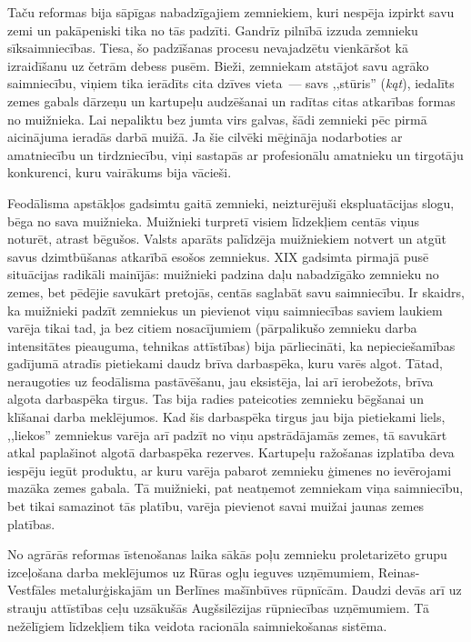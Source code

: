 \documentclass[twoside,a5paper,12pt,fleqn,openany]{extbook}
\newcommand{\pltxti}[1]{\textit{\textpolish{#1}}}
\begin{document}
Taču reformas bija sāpīgas nabadzīgajiem zemniekiem, kuri nespēja izpirkt savu zemi un pakāpeniski tika no tās padzīti. Gandrīz pilnībā izzuda zemnieku sīksaimniecības. Tiesa, šo padzīšanas procesu nevajadzētu vienkāršot kā izraidīšanu uz četrām debess pusēm. Bieži, zemniekam atstājot savu agrāko saimniecību, viņiem tika ierādīts cita dzīves vieta~--- savs ,,stūris'' (\pltxti{kąt}), iedalīts zemes gabals dārzeņu un kartupeļu audzēšanai un radītas citas atkarības formas no muižnieka. Lai nepaliktu bez jumta virs galvas, šādi zemnieki pēc pirmā aicinājuma ieradās darbā muižā. Ja šie cilvēki mēģināja nodarboties ar amatniecību un tirdzniecību, viņi sastapās ar profesionālu amatnieku un tirgotāju konkurenci, kuru vairākums bija vācieši.

Feodālisma apstākļos gadsimtu gaitā zemnieki, neizturējuši ekspluatācijas slogu, bēga no sava muižnieka. Muižnieki turpretī visiem līdzekļiem centās viņus noturēt, atrast bēgušos. Valsts aparāts palīdzēja muižniekiem notvert un atgūt savus dzimtbūšanas atkarībā esošos zemniekus. XIX gadsimta pirmajā pusē situācijas radikāli mainījās: muižnieki padzina daļu nabadzīgāko zemnieku no zemes, bet pēdējie savukārt pretojās, centās saglabāt savu saimniecību. Ir skaidrs, ka muižnieki padzīt zemniekus un pievienot viņu saimniecības saviem laukiem varēja tikai tad, ja bez citiem nosacījumiem (pārpalikušo zemnieku darba intensitātes pieauguma, tehnikas attīstības) bija pārliecināti, ka nepieciešamības gadījumā atradīs pietiekami daudz brīva darbaspēka, kuru varēs algot. Tātad, neraugoties uz feodālisma pastāvēšanu, jau eksistēja, lai arī ierobežots, brīva algota darbaspēka tirgus. Tas bija radies pateicoties zemnieku bēgšanai un klīšanai darba meklējumos. Kad šis darbaspēka tirgus jau bija pietiekami liels, ,,liekos'' zemniekus varēja arī padzīt no viņu apstrādājamās zemes, tā savukārt atkal paplašinot algotā darbaspēka rezerves. Kartupeļu ražošanas izplatība deva iespēju iegūt produktu, ar kuru varēja pabarot zemnieku ģimenes no ievērojami mazāka zemes gabala. Tā muižnieki, pat neatņemot zemniekam viņa saimniecību, bet tikai samazinot tās platību, varēja pievienot savai muižai jaunas zemes platības.

No agrārās reformas īstenošanas laika sākās poļu zemnieku proletarizēto grupu izceļošana darba meklējumos uz Rūras ogļu ieguves uzņēmumiem, Reinas-Vestfāles metalurģiskajām un Berlīnes mašīnbūves rūpnīcām. Daudzi devās arī uz strauju attīstības ceļu uzsākušās Augšsilēzijas rūpniecības uzņēmumiem. Tā nežēlīgiem līdzekļiem tika veidota racionāla saimniekošanas sistēma.
\end{document}
